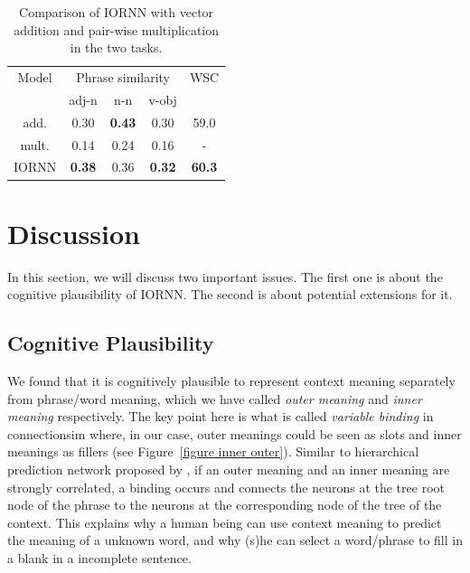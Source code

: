\documentclass[11pt]{article}
\begin{document}
\begin{table}[!ht]
	\center
	\begin{tabular}{c|ccc|c}
	Model & \multicolumn{3}{c}{Phrase similarity} & WSC \\ 
	& adj-n & n-n & v-obj &  \\ \hline
	
	add. & 0.30 & \textbf{0.43} & 0.30 & 59.0\\ 
	mult. & 0.14 & 0.24 & 0.16 & - \\ 
	IORNN & \textbf{0.38} & 0.36 & \textbf{0.32} & \textbf{60.3} \\ \hline
	
	\end{tabular}
	\caption{Comparison of IORNN with vector addition and pair-wise multiplication
	in the two tasks.}
	\label{table summary}
\end{table}


\section{Discussion}
\label{section discussion}
In this section, we will discuss two important issues. The first one is about the cognitive 
plausibility of IORNN. The second is about potential extensions for it.

\subsection{Cognitive Plausibility}
\label{subsection cog plau}

We found that it is cognitively plausible to 
represent context meaning separately from phrase/word meaning, which we have called
\textit{outer meaning} and \textit{inner meaning} respectively. The key point here
is what is called \textit{variable binding} in connectionsim \cite{smolensky1990tensor} 
where, in our case, 
outer meanings could be seen as slots and inner meanings as fillers 
(see Figure~\ref{figure inner outer}). 
Similar to hierarchical prediction network proposed by , 
if an outer meaning and an inner meaning are strongly correlated, a binding occurs
and connects the neurons at the tree root node of the phrase to the neurons at the 
corresponding node of the tree of the context. This explains why a human being can use  
context meaning to predict the meaning of a unknown word, and why (s)he can select a word/phrase 
to fill in a blank in a incomplete sentence.
\end{document}
